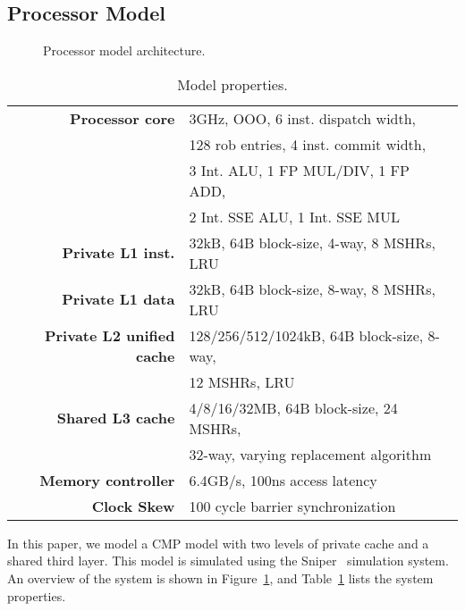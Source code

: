 
\subsection{Processor Model}
\begin{figure}[t]
\centering
\caption{Processor model architecture.}
\label{fig:processor_model}
\end{figure}


\begin{table}[ht]
\centering
\begin{tabular}{rl}
\toprule
\bf{Processor core}                 & 3GHz, OOO, 6 inst. dispatch width,     \\
                                    & 128 rob entries, 4 inst. commit width, \\
                                    & 3 Int. ALU, 1 FP MUL/DIV, 1 FP ADD, \\
                                    & 2 Int. SSE ALU, 1 Int. SSE MUL \\
\bf{Private L1 inst.}               & 32kB, 64B block-size, 4-way, 8 MSHRs, LRU \\
\bf{Private L1 data}                & 32kB, 64B block-size, 8-way, 8 MSHRs, LRU \\
\bf{Private L2 unified cache}       & 128/256/512/1024kB, 64B block-size, 8-way, \\
                                    & 12 MSHRs, LRU      \\
\bf{Shared L3 cache}                & 4/8/16/32MB, 64B block-size, 24 MSHRs, \\
                                    & 32-way, varying replacement algorithm         \\
\bf{Memory controller}              & 6.4GB/s, 100ns access latency         \\
\bf{Clock Skew}                     & 100 cycle barrier synchronization        \\
\bottomrule                             
\end{tabular}
\caption{Model properties.}
\label{tbl:processor_model:properties}
\end{table}

In this paper, we model a CMP model with two levels of private cache and a shared third layer.
This model is simulated using the Sniper~\cite{Carlson2011a} simulation system.
An overview of the system is shown in Figure~\ref{fig:processor_model}, and Table~\ref{tbl:processor_model:properties} lists the system properties.

